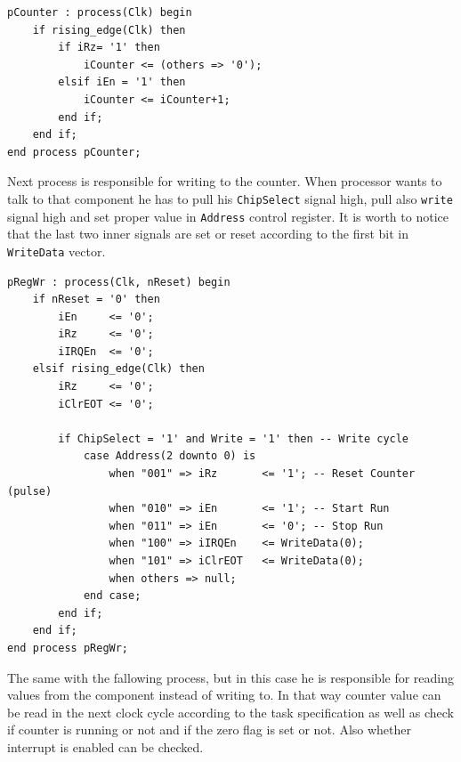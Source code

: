 \begin{verbatim}
pCounter : process(Clk) begin
    if rising_edge(Clk) then
        if iRz= '1' then
            iCounter <= (others => '0');
        elsif iEn = '1' then
            iCounter <= iCounter+1;
        end if;
    end if;
end process pCounter;
\end{verbatim}
Next process is responsible for writing to the counter. When processor wants to talk to that component he has to pull his \verb|ChipSelect| signal high, pull also \verb|write| signal high and set proper value in \verb|Address| control register. It is worth to notice that the last two inner signals are set or reset according to the first bit in \verb|WriteData| vector.
\begin{verbatim}
pRegWr : process(Clk, nReset) begin
    if nReset = '0' then 
        iEn     <= '0'; 
        iRz     <= '0';
        iIRQEn  <= '0';
    elsif rising_edge(Clk) then
        iRz     <= '0';
        iClrEOT <= '0';
        
        if ChipSelect = '1' and Write = '1' then -- Write cycle
            case Address(2 downto 0) is
                when "001" => iRz       <= '1'; -- Reset Counter (pulse)
                when "010" => iEn       <= '1'; -- Start Run
                when "011" => iEn       <= '0'; -- Stop Run
                when "100" => iIRQEn    <= WriteData(0);
                when "101" => iClrEOT   <= WriteData(0);
                when others => null;
            end case;
        end if;
    end if;
end process pRegWr;
\end{verbatim}
The same with the fallowing process, but in this case he is responsible for reading values from the component instead of writing to. In that way counter value can be read in the next clock cycle according to the task specification as well as check if counter is running or not and if the zero flag is set or not. Also whether interrupt is enabled can be checked. 

